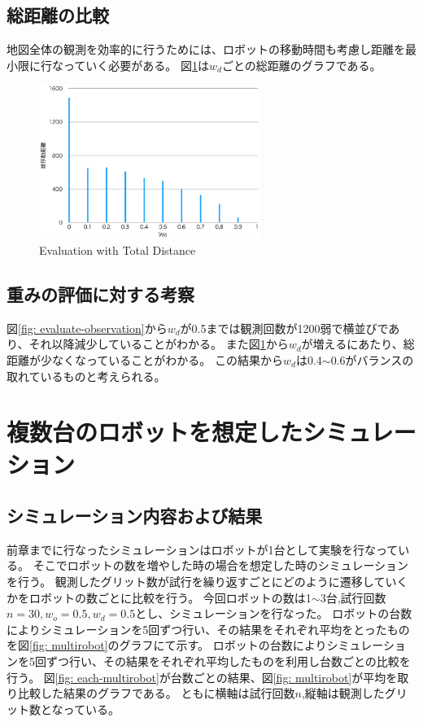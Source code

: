 \documentclass{jsarticle}
\begin{document}
\subsection{総距離の比較}
\label{evaluate-distance}
地図全体の観測を効率的に行うためには、ロボットの移動時間も考慮し距離を最小限に行なっていく必要がある。
図\ref{fig: evaluate-distance}は$w_d$ごとの総距離のグラフである。


\begin{figure}[tbh]
 \centering
  \includegraphics[height=50mm]{fig/evaluate-distance.eps}
  \vspace*{-4mm}
  \caption{Evaluation with Total Distance}
  \label{fig: evaluate-distance}
\end{figure}

\subsection{重みの評価に対する考察}
図\ref{fig: evaluate-observation}から$w_d$が0.5までは観測回数が1200弱で横並びであり、それ以降減少していることがわかる。
また図\ref{fig: evaluate-distance}から$w_d$が増えるにあたり、総距離が少なくなっていることがわかる。
この結果から$w_d$は0.4$\sim$0.6がバランスの取れているものと考えられる。

\section{複数台のロボットを想定したシミュレーション}
\subsection{シミュレーション内容および結果}

前章までに行なったシミュレーションはロボットが1台として実験を行なっている。
そこでロボットの数を増やした時の場合を想定した時のシミュレーションを行う。
観測したグリット数が試行を繰り返すごとにどのように遷移していくかをロボットの数ごとに比較を行う。
今回ロボットの数は1$\sim$3台,試行回数$n=30,w_o=0.5,w_d=0.5$とし、シミュレーションを行なった。
ロボットの台数によりシミュレーションを5回ずつ行い、その結果をそれぞれ平均をとったものを図\ref{fig: multirobot}のグラフにて示す。
ロボットの台数によりシミュレーションを5回ずつ行い、その結果をそれぞれ平均したものを利用し台数ごとの比較を行う。
図\ref{fig: each-multirobot}が台数ごとの結果、図\ref{fig: multirobot}が平均を取り比較した結果のグラフである。
ともに横軸は試行回数$n$,縦軸は観測したグリット数となっている。
\end{document}
